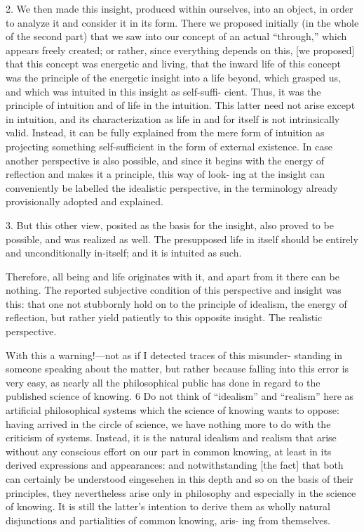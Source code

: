 2. We then made this insight, produced within ourselves,
into an object, in order to analyze it and consider it in its form.
There we proposed initially (in the whole of the second part)
that we saw into our concept of an actual “through,”
which appears freely created; or rather, since everything depends
on this, [we proposed] that this concept was energetic and living,
that the
inward life of this concept was the principle of the energetic insight into a life
beyond, which grasped us, and which was intuited in this insight as self-suffi-
cient.
Thus, it was the principle of intuition
and of life in the intuition.
This latter need not arise except in intuition,
and its characterization as life in and for itself
is not intrinsically valid.
Instead, it can be fully explained from the
mere form of intuition as projecting something self-sufficient in the form of
external existence.
In case another perspective is also possible, and since it
begins with the energy of reflection and makes it a principle, this way of look-
ing at the insight can conveniently be labelled the idealistic perspective, in the
terminology already provisionally adopted and explained.

3. But this other view, posited as the basis for the insight,
also proved to be possible, and was realized as well.
The presupposed life in itself should be
entirely and unconditionally in-itself;
and it is intuited as such.

Therefore, all being and life originates with it,
and apart from it there can be nothing.
The reported subjective condition of
this perspective and insight was this:
that one not stubbornly hold on to
the principle of idealism,
the energy of reflection,
but rather yield patiently
to this opposite insight.
The realistic perspective.

With this a warning!—not as if I detected traces of this misunder-
standing in someone speaking about the matter, but rather because falling into
this error is very easy, as nearly all the philosophical public has done in regard
to the published science of knowing.
6 Do not think of “idealism” and “realism”
here as artificial philosophical systems which the science of knowing wants to
oppose: having arrived in the circle of science, we have nothing more to do
with the criticism of systems.
Instead, it is the natural idealism and realism
that arise without any conscious effort on our part in common knowing, at
least in its derived expressions and appearances: and notwithstanding [the
fact] that both can certainly be understood {eingesehen} in this depth and so
on the basis of their principles, they nevertheless arise only in philosophy and
especially in the science of knowing.
It is still the latter’s intention to derive
them as wholly natural disjunctions and partialities of common knowing, aris-
ing from themselves.


